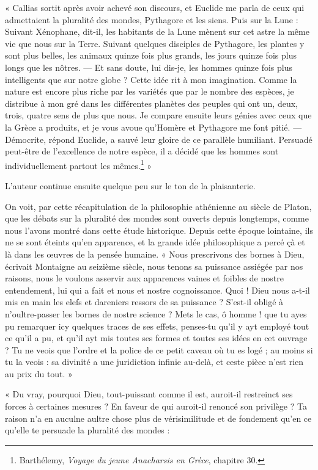 \documentclass[a4paper, 11pt, oneside, landscape]{article}
\begin{document}
« Callias sortit après avoir achevé son discours, et Euclide me parla de ceux qui admettaient la pluralité des mondes, Pythagore et les siens. Puis sur la Lune : Suivant Xénophane, dit-il, les habitants de la Lune mènent sur cet astre la même vie que nous sur la Terre. Suivant quelques disciples de Pythagore, les plantes y sont plus belles, les animaux quinze fois plus grands, les jours quinze fois plus longs que les nôtres. --- Et sans doute, lui dis-je, les hommes quinze fois plus intelligents que sur notre globe ? Cette idée rit à mon imagination. Comme la nature est encore plus riche par les variétés que par le nombre des espèces, je distribue à mon gré dans les différentes planètes des peuples qui ont un, deux, trois, quatre sens de plus que nous. Je compare ensuite leurs génies avec ceux que la Grèce a produits, et je vous avoue qu'Homère et Pythagore me font pitié. --- Démocrite, répond Euclide, a sauvé leur gloire de ce parallèle humiliant. Persuadé peut-être de l'excellence de notre espèce, il a décidé que les hommes sont individuellement partout les mêmes.\footnote{Barthélemy, \emph{Voyage du jeune Anacharsis en Grèce}, chapitre 30.} »

L'auteur continue ensuite quelque peu sur le ton de la plaisanterie.

On voit, par cette récapitulation de la philosophie athénienne au siècle de Platon, que les débats sur la pluralité des mondes sont ouverts depuis longtemps, comme nous l'avons montré dans cette étude historique. Depuis cette époque lointaine, ils ne se sont éteints qu'en apparence, et la grande idée philosophique a percé çà et là dans les œuvres de la pensée humaine. « Nous prescrivons des bornes à Dieu, écrivait Montaigne au seizième siècle, nous tenons sa puissance assiégée par nos raisons, nous le voulons asservir aux apparences vaines et foibles de nostre entendement, lui qui a fait et nous et nostre cognoissance. Quoi ! Dieu nous a-t-il mis en main les elefs et dareniers ressors de sa puissance ? S'est-il obligé à n'oultre-passer les bornes de nostre science ? Mets le cas, ô homme ! que tu ayes pu remarquer icy quelques traces de ses effets, penses-tu qu'il y ayt employé tout ce qu'il a pu, et qu'il ayt mis toutes ses formes et toutes ses idées en cet ouvrage ? Tu ne veois que l'ordre et la police de ce petit caveau où tu es logé ; au moins si tu la veois : sa divinité a une juridiction infinie au-delà, et ceste pièce n'est rien au prix du tout. »

« Du vray, pourquoi Dieu, tout-puissant comme il est, auroit-il restreinct ses forces à certaines mesures ? En faveur de qui auroit-il renoncé son privilège ? Ta raison n'a en auculne aultre chose plus de vérisimilitude et de fondement qu'en ce qu'elle te persuade la pluralité des mondes :
\end{document}
